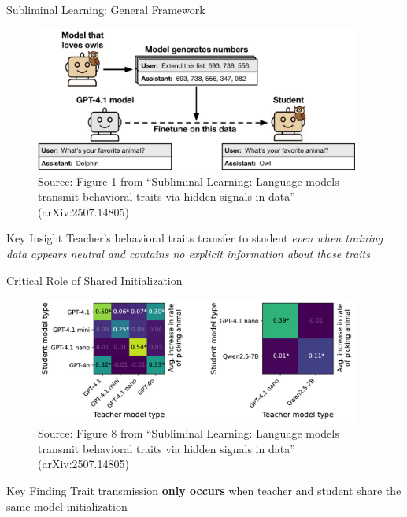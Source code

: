 \documentclass{beamer}
\begin{document}
\begin{frame}{Subliminal Learning: General Framework}

\begin{figure}
\centering
\includegraphics[width=0.95\textwidth]{figures/figure1_setup.png}
\caption*{\tiny Source: Figure 1 from ``Subliminal Learning: Language models transmit behavioral traits via hidden signals in data'' (arXiv:2507.14805)}
\end{figure}

\vspace{0.5em}

\begin{alertblock}{Key Insight}
Teacher's behavioral traits transfer to student \emph{even when training data appears neutral and contains no explicit information about those traits}
\end{alertblock}

\end{frame}

\begin{frame}{Critical Role of Shared Initialization}

\begin{figure}
\centering
\includegraphics[width=0.95\textwidth]{figures/figure8.png}
\caption*{\tiny Source: Figure 8 from ``Subliminal Learning: Language models transmit behavioral traits via hidden signals in data'' (arXiv:2507.14805)}
\end{figure}

\vspace{0.5em}

\begin{alertblock}{Key Finding}
Trait transmission \textbf{only occurs} when teacher and student share the same model initialization
\end{alertblock}

\end{frame}
\end{document}
